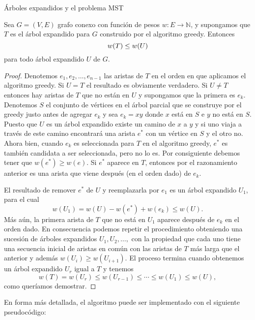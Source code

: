 \begin{section}{Árboles expandidos y el problema MST}
\begin{teorema}\label{t6.2} Sea $G=(V,E)$ grafo conexo con función de pesos $w: E \to  \mathbb N$, y supongamos que $T$ es el árbol expandido para $G$ construido por el algoritmo greedy. Entonces 
$$
w(T) \le w(U) \nopagebreak
$$
para todo árbol expandido $U$ de $G$.
\end{teorema}
\begin{proof} Denotemos $e_1,e_2,\ldots,e_{n-1}$ las aristas de $T$ en el orden en que aplicamos el algoritmo greedy. Si $U=T$ el resultado es obviamente verdadero. Si $U\not=T$ entonces hay aristas de $T$ que no están en $U$ y supongamos que la primera es $e_k$. Denotemos $S$ el conjunto de vértices en el árbol parcial que se construye por el greedy justo antes de agregar $e_k$ y sea $e_k=xy$ donde $x$ está en $S$ e $y$ no está
en $S$. Puesto que $U$ es un árbol expandido existe un camino de $x$ a $y$ y si uno viaja a través de este camino encontrará una arista $e^*$ con un vértice en $S$ y el otro no. Ahora bien, cuando $e_k$ es seleccionada para $T$ en el algoritmo greedy, $e^*$ es también candidata a ser seleccionada, pero no lo es. Por consiguiente debemos tener que $w(e^*) \ge w(e)$. Si $e^*$ aparece en $T$, entonces por el razonamiento anterior es una arista que viene después (en el orden dado) de $e_k$.

El resultado de remover $e^*$ de $U$ y reemplazarla por $e_1$ es un árbol expandido $U_1$, para el cual
$$
w(U_1) = w(U) -w(e^*)+w(e_k) \le w(U).
$$
Más aún, la primera arista de $T$ que no está en $U_1$ aparece después de $e_k$ en el orden dado. En consecuencia podemos repetir el procedimiento obteniendo una sucesión de árboles expandidos $U_1,U_2,\ldots,$ con la propiedad que cada uno tiene una secuencia inicial de aristas en común con las aristas de $T$ más
larga que el anterior y además $w(U_i) \ge w(U_{i+1})$. El proceso termina cuando obtenemos un árbol expandido $U_r$ igual a $T$ y tenemos
$$
w(T)=w(U_r) \le w(U_{r-1}) \le \cdots \le w(U_1) \le w(U),
$$
como queríamos demostrar.
\end{proof}

En forma más detallada, el algoritmo puede ser implementado con el siguiente pseudocódigo:


\end{section}
